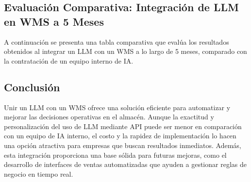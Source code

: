\subsection{Evaluación Comparativa: Integración de LLM en WMS a 5 Meses}

A continuación se presenta una tabla comparativa que evalúa los resultados obtenidos al integrar un LLM con un WMS a lo largo de 5 meses, comparado con la contratación de un equipo interno de IA.

\begin{table}[H]
\centering
\caption{Evaluación de Resultados a 5 Meses: Integración de LLM en WMS vs. Equipo Interno de IA}
\end{table}

\subsection{Conclusión}

Unir un LLM con un WMS ofrece una solución eficiente para automatizar y mejorar las decisiones operativas en el almacén. Aunque la exactitud y personalización del uso de LLM mediante API puede ser menor en comparación con un equipo de IA interno, el costo y la rapidez de implementación lo hacen una opción atractiva para empresas que buscan resultados inmediatos. Además, esta integración proporciona una base sólida para futuras mejoras, como el desarrollo de interfaces de ventas automatizadas que ayuden a gestionar reglas de negocio en tiempo real.

